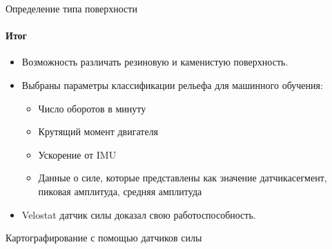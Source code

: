 \documentclass[aspectratio=169,xcolor=table]{beamer}
\begin{document}
\begin{frame}[t]{Определение типа поверхности}
    \framesubtitle{Итог}
    \large
    \begin{itemize}
        \item Возможность различать резиновую и каменистую поверхность.
        \item Выбраны параметры классификации рельефа для машинного обучения:
              \begin{itemize}
                \large
                  \item Число оборотов в минуту
                  \item Крутящий момент двигателя
                  \item Ускорение от IMU
                  \item Данные о силе, которые представлены как значение датчика\/сегмент, пиковая амплитуда, средняя амплитуда
              \end{itemize}
        \item Velostat датчик силы доказал свою работоспособность.
    \end{itemize}
\end{frame}

\begin{frame}[t]{Картографирование с помощью датчиков силы}
    \framesubtitle{}
\end{frame}
\end{document}
